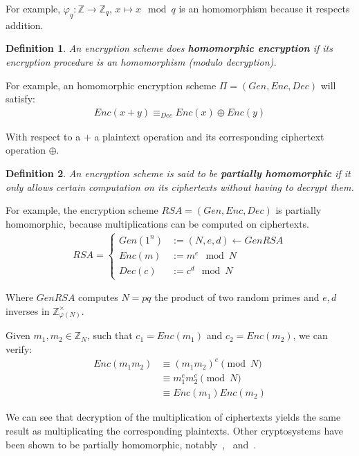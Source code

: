 \documentclass{article}
\newtheorem{definition}{Definition}
\begin{document}
For example, $\varphi_q : \mathbb{Z} \to \mathbb{Z}_q$, $x \mapsto x \mod q$ is an homomorphism because it respects addition.

\begin{definition}
    An encryption scheme does \textbf{homomorphic encryption} if its encryption procedure is an homomorphism (modulo decryption).
\end{definition}

For example, an homomorphic encryption scheme $\Pi = (Gen, Enc, Dec)$ will satisfy:
\begin{align*}
    Enc(x + y) \equiv_{Dec} Enc(x) \oplus Enc(y)
\end{align*}

With respect to a $+$ a plaintext operation and its corresponding ciphertext operation $\oplus$.

\begin{definition}
    An encryption scheme is said to be \textbf{partially homomorphic} if it only allows certain computation on its ciphertexts without having to decrypt them.
\end{definition}

For example, the encryption scheme $RSA = (Gen, Enc, Dec)$ is partially homomorphic, because multiplications can be computed on ciphertexts.
\begin{align*}
    RSA = \begin{cases}
        Gen(1^n) &:= (N, e, d) \gets GenRSA \\
        Enc(m) &:= m^e \mod N \\
        Dec(c) &:= c^d \mod N
    \end{cases}
\end{align*}

Where $GenRSA$ computes $N = pq$ the product of two random primes and $e, d$ inverses in $\mathbb{Z}^{\times}_{\varphi(N)}$.

Given $m_1, m_2 \in \mathbb{Z}_N$, such that $c_1 = Enc(m_1)$ and $c_2 = Enc(m_2)$, we can verify:
\begin{align*}
    Enc(m_1m_2) 
        &\equiv {(m_1m_2)}^e \pmod N \\
        &\equiv m_1^e m_2^e \pmod N \\
        &\equiv Enc(m_1)Enc(m_2)
\end{align*}

We can see that decryption of the multiplication of ciphertexts yields the same result as multiplicating the corresponding plaintexts. Other cryptosystems have been shown to be partially homomorphic, notably~\cite{elgamal1985public},~\cite{benaloh1994dense} and~\cite{paillier1999}.
\end{document}
